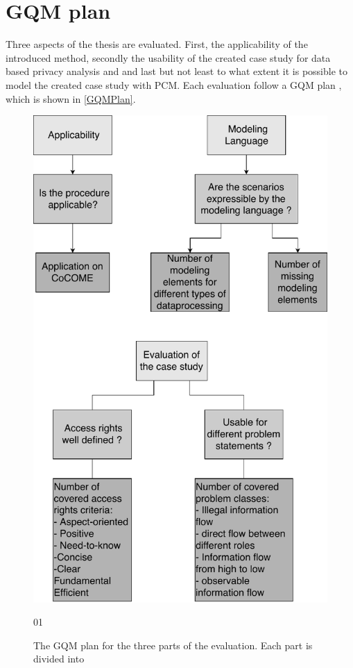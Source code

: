 \section{GQM plan}
Three aspects of the thesis are evaluated. First, the applicability of the introduced method, secondly the usability of the created case study for data based privacy analysis and and last but not least to what extent it is possible to model the created case study with PCM. 
 Each evaluation follow a GQM plan \cite{GQM_Intro}, which is shown in \autoref{GQMPlan}. 
\begin{figure}
\includegraphics[scale=.8, origin=c ]{logos/OverviewEval.pdf}
\caption{The GQM plan for the three parts of the evaluation. Each part is divided into }01
\label{GQMPlan}
\end{figure}
